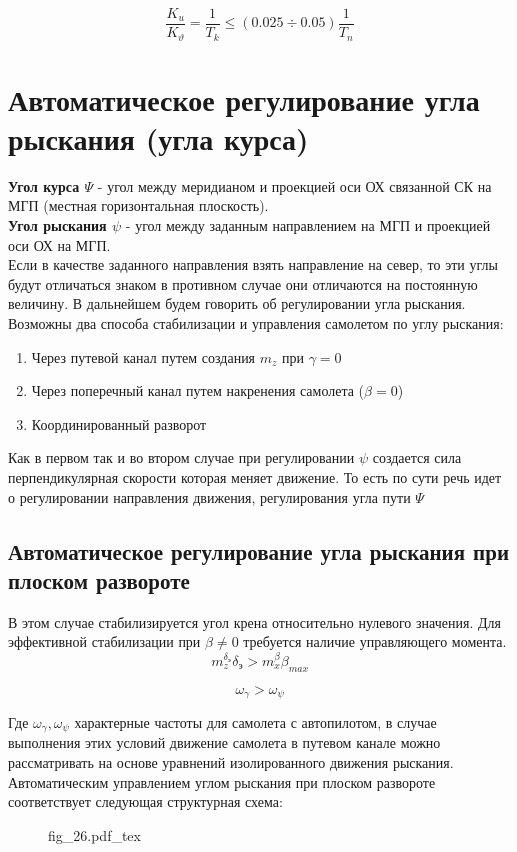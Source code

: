 \documentclass{article}
\begin{document}
\[
    \frac{K_u}{K_\vartheta} =  \frac{1}{T_k} \leq (0.025 \div 0.05)
    \frac{1}{T_n}
\]
\section{Автоматическое регулирование угла рыскания (угла курса)}
\textbf{Угол курса $\Psi$} - угол между меридианом и проекцией оси ОХ связанной
СК на МГП (местная горизонтальная плоскость).\\
\textbf{Угол рыскания $\psi$} - угол между заданным направлением на МГП и
проекцией оси ОХ на МГП.\\
Если в качестве заданного направления взять направление на север, то эти углы
будут отличаться знаком в противном случае они отличаются на постоянную
величину. В дальнейшем будем говорить об регулировании угла рыскания. Возможны
два способа стабилизации и управления самолетом по углу рыскания:
\begin{enumerate}
    \item Через путевой канал путем создания $m_z$ при $\gamma = 0$
    \item Через поперечный канал путем накренения самолета ($\beta = 0$)
    \item Координированный разворот
\end{enumerate}
Как в первом так и во втором случае при регулировании $\psi$ создается сила
перпендикулярная скорости которая меняет движение. То есть по сути речь идет о
регулировании направления движения, регулирования угла пути $\Psi$

\subsection{Автоматическое регулирование угла рыскания при плоском развороте}
В этом случае стабилизируется угол крена относительно нулевого значения. Для
эффективной стабилизации при $\beta \neq 0$ требуется наличие управляющего
момента.
\[
    m_z^{\delta_\text{э}} \delta_\text{э} > m_x^\beta \beta_{max}
\]

\[
    \omega_{\gamma} > \omega_{\psi}
\]

Где $\omega_{\gamma}, \omega_{\psi}$ характерные частоты для самолета с
автопилотом, в случае выполнения этих условий движение самолета в путевом
канале можно рассматривать на основе уравнений изолированного движения
рыскания. Автоматическим управлением углом рыскания при плоском развороте
соответствует следующая структурная схема:

\begin{figure}[H]
    \centering
    {fig_26.pdf_tex}
\end{figure}
\end{document}

